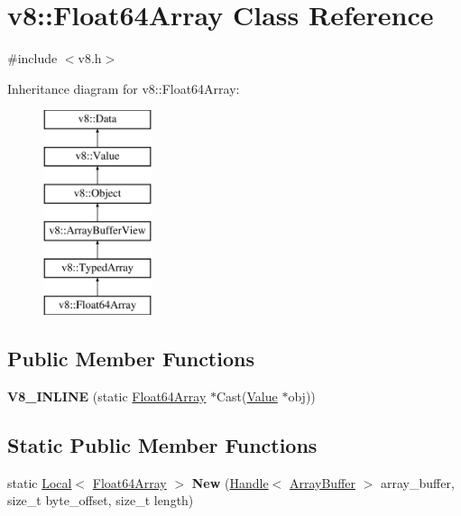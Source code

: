\hypertarget{classv8_1_1_float64_array}{}\section{v8\+:\+:Float64\+Array Class Reference}
\label{classv8_1_1_float64_array}


{\ttfamily \#include $<$v8.\+h$>$}

Inheritance diagram for v8\+:\+:Float64\+Array\+:\begin{figure}[H]
\begin{center}
\leavevmode
\includegraphics[height=6.000000cm]{classv8_1_1_float64_array}
\end{center}
\end{figure}
\subsection*{Public Member Functions}
\begin{DoxyCompactItemize}
\item 
\hypertarget{classv8_1_1_float64_array_ab7d7abc2a709e38dfab557c26c64880a}{}{\bfseries V8\+\_\+\+I\+N\+L\+I\+N\+E} (static \hyperlink{classv8_1_1_float64_array}{Float64\+Array} $\ast$Cast(\hyperlink{classv8_1_1_value}{Value} $\ast$obj))\label{classv8_1_1_float64_array_ab7d7abc2a709e38dfab557c26c64880a}

\end{DoxyCompactItemize}
\subsection*{Static Public Member Functions}
\begin{DoxyCompactItemize}
\item 
\hypertarget{classv8_1_1_float64_array_ae09a38a945fb88065956e1d87132f0b4}{}static \hyperlink{classv8_1_1_local}{Local}$<$ \hyperlink{classv8_1_1_float64_array}{Float64\+Array} $>$ {\bfseries New} (\hyperlink{classv8_1_1_handle}{Handle}$<$ \hyperlink{classv8_1_1_array_buffer}{Array\+Buffer} $>$ array\+\_\+buffer, size\+\_\+t byte\+\_\+offset, size\+\_\+t length)\label{classv8_1_1_float64_array_ae09a38a945fb88065956e1d87132f0b4}

\end{DoxyCompactItemize}


